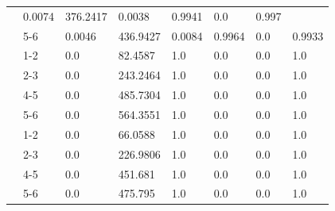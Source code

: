\begin{table}[H]
\begin{longtable}{|p{}|p{}|p{}|p{}|p{}|p{}|p{}|p{}|}
 & 0.0074 & 376.2417 & 0.0038 & 0.9941 & 0.0 & 0.997 \\
   & 
5-6

 & 0.0046 & 436.9427 & 0.0084 & 0.9964 & 0.0 & 0.9933 \\
\hline 
  & 
1-2

 & 0.0 & 82.4587 & 1.0 & 0.0 & 0.0 & 1.0 \\
   & 
2-3

 & 0.0 & 243.2464 & 1.0 & 0.0 & 0.0 & 1.0 \\
   & 
4-5

 & 0.0 & 485.7304 & 1.0 & 0.0 & 0.0 & 1.0 \\
   & 
5-6

 & 0.0 & 564.3551 & 1.0 & 0.0 & 0.0 & 1.0 \\
\hline 
  & 
1-2

 & 0.0 & 66.0588 & 1.0 & 0.0 & 0.0 & 1.0 \\
   & 
2-3

 & 0.0 & 226.9806 & 1.0 & 0.0 & 0.0 & 1.0 \\
   & 
4-5

 & 0.0 & 451.681 & 1.0 & 0.0 & 0.0 & 1.0 \\
   & 
5-6

 & 0.0 & 475.795 & 1.0 & 0.0 & 0.0 & 1.0 \\
 \hline
\end{longtable}
        
\end{table}